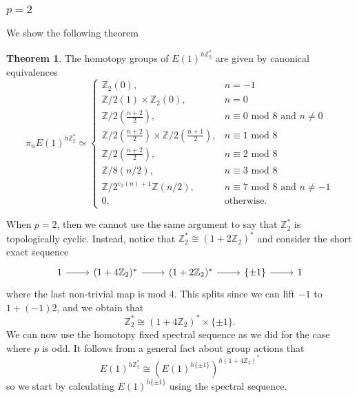 \documentclass[a4paper]{article} %
\theoremstyle{definition}
\newtheorem{theorem}{Theorem} %
\newcommand{\Z}{\mathbb{Z}}
\begin{document}
\subsubsection{$p=2$}

We show the following theorem

\begin{theorem}\label{theorem:p=2final}
  The homotopy groups of $E(1)^{h\Z_2^*}$ are given by canonical equivalences
  \[
  \pi_nE(1)^{h\Z_2^*} \simeq
    \begin{cases}
      \Z_2 (0), & n = -1 \\
      \Z/2  (1) \times \Z_2 (0), & n = 0 \\
      \Z / 2(\frac{n+2}{2}), & n \equiv 0 \text{ mod } 8 \text{ and } n \neq 0 \\
      \Z / 2 (\frac{n+2}{2}) \times \Z / 2 ( \frac{n+1}{2}), & n \equiv 1 \text{ mod } 8 \\
      \Z / 2 (\frac{n+2}{2}), & n \equiv 2 \text{ mod } 8 \\
      \Z / 8 (n/2), & n \equiv 3 \text{ mod } 8 \\
      \Z / 2^{v_2(n) + 1}\Z (n/2), & n \equiv 7 \text{ mod } 8 \text{ and } n \neq -1 \\
      0, & \text{otherwise.}
    \end{cases}
  \]
\end{theorem}
When $p=2$, then we cannot use the same argument to say that $\Z_2^*$ is topologically cyclic. Instead, notice that $\Z_2^* \cong (1 + 2\Z_2)^*$ and consider the short exact sequence
\[
\begin{tikzcd}
  1 \arrow{r} & (1 + 4\Z_2)^* \arrow{r} & (1+2\Z_2)^* \arrow{r} & \{\pm 1\} \rar & 1
\end{tikzcd}
\]
where the last non-trivial map is mod $4$. This splits since we can lift $-1$ to $1 + (-1)2$, and we obtain that
\[
\Z_2^* \cong (1 + 4\Z_2)^* \times \{\pm 1\}.
\]
We can now use the homotopy fixed spectral sequence as we did for the case where $p$ is odd. It follows from a general fact about group actions that
\[
E(1)^{h\Z_2^*} \cong \left(E(1)^{h\{\pm 1\}}\right)^{h(1 + 4\Z_2)^*}
\]
so we start by calculating $E(1)^{h\{\pm 1\}}$ using the spectral sequence.
\end{document}
